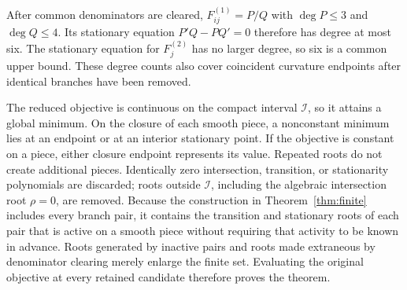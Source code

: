 \documentclass[pdflatex,iicol,sn-mathphys-num]{sn-jnl}
\theoremstyle{definition}
\begin{document}
After common denominators are cleared, $F_{ij}^{(1)}=P/Q$ with
$\deg P\le3$ and $\deg Q\le4$. Its stationary equation
$P'Q-PQ'=0$ therefore has degree at most six. The stationary equation for
$F_j^{(2)}$ has no larger degree, so six is a common upper bound. These degree
counts also cover coincident curvature endpoints after identical branches
have been removed.

The reduced objective is continuous on the compact interval $\mathcal I$, so
it attains a global minimum. On the closure of each smooth piece, a
nonconstant minimum lies at an endpoint or at an interior stationary point.
If the objective is constant on a piece, either closure endpoint represents
its value. Repeated roots do not create additional pieces. Identically zero
intersection, transition, or stationarity polynomials are discarded; roots
outside $\mathcal I$, including the algebraic intersection root $\rho=0$, are
removed. Because the construction in Theorem~\ref{thm:finite} includes every
branch pair, it contains the transition and stationary roots of each pair that
is active on a smooth piece without requiring that activity to be known in
advance. Roots generated by inactive pairs and roots made extraneous by
denominator clearing merely enlarge the finite set. Evaluating the original
objective at every retained candidate therefore proves the theorem.


\end{document}
